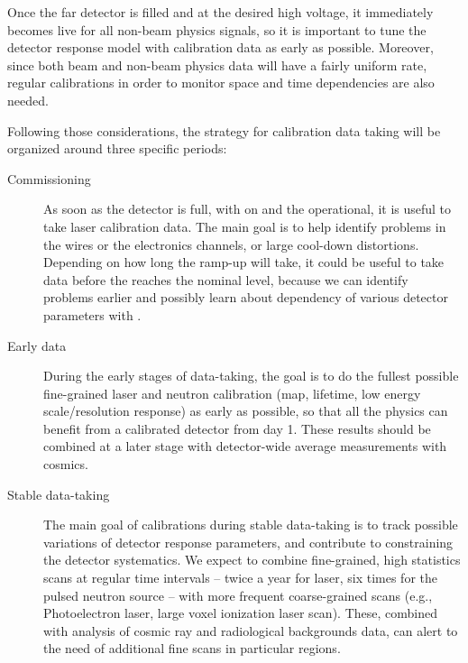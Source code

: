
Once the far detector is filled and at the desired high voltage, it immediately becomes live for all non-beam physics signals, so it is important to tune the detector response model with calibration data as early as possible. Moreover, since both beam and non-beam physics data will have a fairly uniform rate, regular calibrations in order to monitor space and time dependencies are also needed.

Following those considerations, the strategy for calibration data taking will be organized around three specific periods:
\begin{description}
\item[Commissioning] As soon as the detector is full, with  on and the  operational, it is useful to take laser calibration data. The main goal is to help identify problems in the  wires or the electronics channels, or large cool-down distortions. Depending on how long the ramp-up will take, it could be useful to take data before the  reaches the nominal level, because we can identify problems earlier and possibly learn about dependency of various detector parameters with \efield.
\item[Early data] During the early stages of data-taking, the goal is to do the fullest possible fine-grained laser and neutron calibration (\efield map, lifetime, low energy scale/resolution response) as early as possible, so that all the physics can benefit from a calibrated detector from day 1. 
These results should be combined at a later stage with detector-wide average measurements with cosmics. 
\item[Stable data-taking] The main goal of %
calibrations during stable data-taking is to track possible variations of detector response parameters, and contribute to constraining the %
detector systematics. We expect to combine fine-grained, high statistics scans at regular time intervals -- twice a year for laser, six times for the pulsed neutron source -- with more frequent coarse-grained scans (e.g., Photoelectron laser, large voxel ionization laser scan). These, combined with analysis of cosmic ray and radiological backgrounds data, can alert to the need of additional fine scans in particular regions.
\end{description}